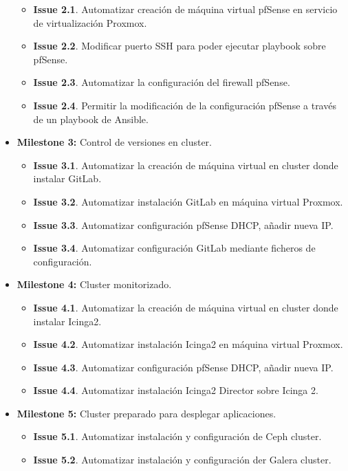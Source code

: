 \begin{text}
\begin{itemize}
				\begin{itemize}
					\item \textbf{Issue 2.1}. Automatizar creación de máquina virtual pfSense en servicio de virtualización Proxmox.
					\item \textbf{Issue 2.2}. Modificar puerto SSH para poder ejecutar playbook sobre pfSense.
					\item \textbf{Issue 2.3}. Automatizar la configuración del firewall pfSense.
					\item \textbf{Issue 2.4}. Permitir la modificación de la configuración pfSense a través de un playbook de Ansible.
				\end{itemize}
			\item \textbf{Milestone 3:} Control de versiones en cluster.
				\begin{itemize}
					\item \textbf{Issue 3.1}. Automatizar la creación de máquina virtual en cluster donde instalar GitLab.
					\item \textbf{Issue 3.2}. Automatizar instalación GitLab en máquina virtual Proxmox.
					\item \textbf{Issue 3.3}. Automatizar configuración pfSense DHCP, añadir nueva IP.
					\item \textbf{Issue 3.4}. Automatizar configuración GitLab mediante ficheros de configuración.
				\end{itemize}
			\item \textbf{Milestone 4:} Cluster monitorizado.
				\begin{itemize}
					\item \textbf{Issue 4.1}. Automatizar la creación de máquina virtual en cluster donde instalar Icinga2.
					\item \textbf{Issue 4.2}. Automatizar instalación Icinga2 en máquina virtual Proxmox.
					\item \textbf{Issue 4.3}. Automatizar configuración pfSense DHCP, añadir nueva IP.
					\item \textbf{Issue 4.4}. Automatizar instalación Icinga2 Director sobre Icinga 2.
				\end{itemize}
			\item \textbf{Milestone 5:} Cluster preparado para desplegar aplicaciones.
				\begin{itemize}
					\item \textbf{Issue 5.1}. Automatizar instalación y configuración de Ceph cluster.
					\item \textbf{Issue 5.2}. Automatizar instalación y configuración der Galera cluster.

\end{itemize}
\end{itemize}
\end{text}
